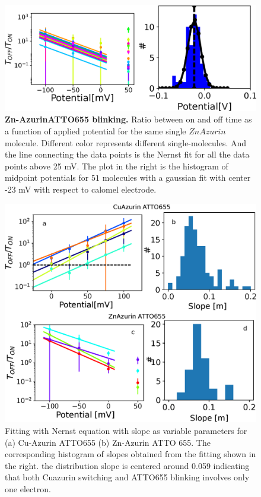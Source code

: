 \documentclass[11pt,a4paper,onecolumn]{article}
\begin{document}
\begin{figure}
  \centering
  \includegraphics[width=\textwidth,keepaspectratio]{SI_potential_Zn.eps}
	\makeatletter
	\renewcommand{\fnum@figure}{\figurename~S\thefigure}
	\makeatother
  \caption{\textbf{Zn-AzurinATTO655 blinking.} Ratio between on and off time as a function of applied potential for the same single $ZnAzurin$ molecule. Different color represents different single-molecules. And the line connecting the data points is the Nernst fit for all the data points above 25 mV. The plot in the right is the histogram of midpoint potentials for $51$ molecules with a gaussian fit with center -23 mV with respect to calomel electrode.}
  \label{SIfig:2Dhist_Zn}
\end{figure}
\begin{figure}
  \centering
  \includegraphics[width=\textwidth,keepaspectratio]{SI_potential_slope.eps}
	\makeatletter
	\renewcommand{\fnum@figure}{\figurename~S\thefigure}
	\makeatother
  \caption{Fitting with Nernst equation with slope as variable parameters for  (a) Cu-Azurin ATTO655 (b) Zn-Azurin ATTO 655. The corresponding histogram of slopes obtained from the fitting shown in the right. the distribution slope is centered around 0.059 indicating that both Cuazurin switching and ATTO655 blinking involves only one electron.}
  \label{SIfig:potential_slope}
\end{figure}
\end{document}
